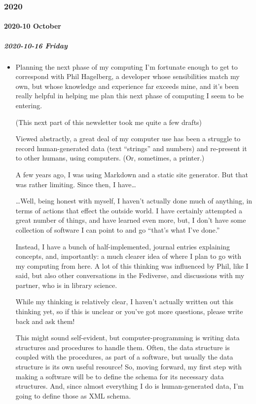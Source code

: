 \documentclass[11pt]{article}
\begin{document}
\subsubsection*{2020}
\label{sec:org1fbd345}
\startcontents[level-3]
\paragraph*{2020-10 October}
\label{sec:orgbc2f0cd}
\startcontents[level-4]
\subparagraph*{2020-10-16 Friday}
\label{sec:orgb4b7719}
\begin{itemize}
\item Planning the next phase of my computing
\label{sec:org16b7e63}
I'm fortunate enough to get to correspond with Phil Hagelberg, a developer whose sensibilities match my own, but whose knowledge and experience far exceeds mine, and it’s been really helpful in helping me plan this next phase of computing I seem to be entering.

(This next part of this newsletter took me quite a few drafts)

Viewed abstractly, a great deal of my computer use has been a struggle to record human-generated data (text “strings” and numbers) and re-present it to other humans, using computers. (Or, sometimes, a printer.)

A few years ago, I was using Markdown and a static site generator. But that was rather limiting. Since then, I have…

…Well, being honest with myself, I haven’t actually done much of anything, in terms of actions that effect the outside world. I have certainly attempted a great number of things, and have learned even more, but, I don’t have some collection of software I can point to and go “that’s what I’ve done.”

Instead, I have a bunch of half-implemented, journal entries explaining concepts, and, importantly: a much clearer idea of where I plan to go with my computing from here. A lot of this thinking was influenced by Phil, like I said, but also other conversations in the Fediverse, and discussions with my partner, who is in library science.

While my thinking is relatively clear, I haven’t actually written out this thinking yet, so if this is unclear or you’ve got more questions, please write back and ask them!

This might sound self-evident, but computer-programming is writing data structures and procedures to handle them. Often, the data structure is coupled with the procedures, as part of a software, but usually the data structure is its own useful resource! So, moving forward, my first step with making a software will be to define the schema for its necessary data structures. And, since almost everything I do is human-generated data, I’m going to define those as XML schema.


\end{itemize}
\end{document}
